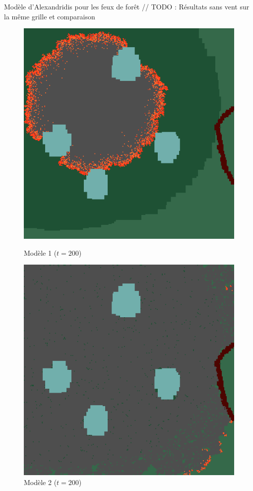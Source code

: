 \documentclass{beamer}
\begin{document}
\begin{frame}{Modèle d'Alexandridis pour les feux de forêt \hyperlink{jump}{\beamerbutton{ }} \hypertarget{9}{\beamerbutton{ }}}
    // TODO : Résultats sans vent sur la même grille et comparaison

    \begin{figure}[!htb]
        \begin{minipage}{0.48\textwidth}
          \centering
          \includegraphics[width=.8\linewidth]{pictures/model1/land_200.png}
          \caption{Modèle 1 ($t=200$)}\label{Fig:Data1}
        \end{minipage}\hfill
        \begin{minipage}{0.48\textwidth}
          \centering
          \includegraphics[width=.8\linewidth]{pictures/model2/land_200_nowind.png}
          \caption{Modèle 2 ($t=200$)}\label{Fig:Data2}
        \end{minipage}
     \end{figure}
\end{frame}
\end{document}
